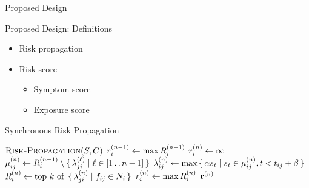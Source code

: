 \documentclass[12pt]{beamer}
\begin{document}
\begin{section}{Proposed Design}

\begin{frame}{Proposed Design: Definitions}
  \begin{itemize}
    \item Risk propagation
    \item Risk score
      \begin{itemize}
        \item Symptom score
        \item Exposure score
      \end{itemize}
  \end{itemize}
\end{frame}

\begin{frame}{Synchronous Risk Propagation}
\begin{spacing}{1.4}
\begin{algorithmic}[1]
    \item[$\Call{\nRiskPropagation}{\vScores, \vContacts}$]
    \pause
    \State $r_{i}^{(n - 1)} \leftarrow \max R_{i}^{(n - 1)}$
    \pause
    \State $r_{i}^{(n)} \leftarrow \infty$
    \pause
    \pause
      \State $\mu_{ij}^{(n)} \leftarrow R_{i}^{(n - 1)} \setminus \set{ \lambda_{ji}^{(\ell)} | \ell \in [1 \mathinner{\ldotp \ldotp} n - 1]}$
      \pause
      \State $\lambda_{ij}^{(n)} \leftarrow \max \set{ \alpha s_t| s_t\in \mu_{ij}^{(n)}, t< t_{ij} + \beta}$
      \pause
      \State $\vRiskScores{i}{n} \assign \topK{\setBuilder{\vFactorMessage{j}{i}{n}}{\vFactor[ij] \in \vNeighbors_i}}$
      \pause
      \State $r_{i}^{(n)} \leftarrow \max R_{i}^{(n)}$
      \pause
    \EndWhile
    \State \Return $\mathbf{r}^{(n)}$
  \end{algorithmic}
\end{spacing}
\end{frame}

\end{section}
\end{document}
